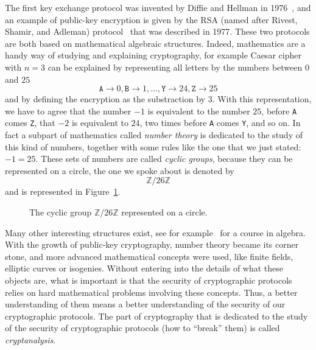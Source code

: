 The first key exchange protocol was invented by Diffie and Hellman in
1976~\cite{DH76}, and an example of public-key encryption is given by the RSA
(named after Rivest, Shamir, and Adleman) protocol~\cite{RSA78} that was
described in 1977. These two protocols are both based on mathematical algebraic
structures. Indeed, mathematics are a handy way of studying and explaining
cryptography, for example Caesar cipher with $n=3$ can be explained by
representing all letters by the numbers between $0$ and $25$
\[
  \texttt{A}\to 0, \texttt{B} \to 1, \dots,\texttt{Y}\to24, \texttt{Z}\to25
\]
and by defining the encryption as the substraction by $3$. With this
representation, we have to agree that the number $-1$ is equivalent to the
number $25$, \ie before \texttt{A} comes \texttt{Z}, that $-2$ is equivalent to
$24$, \ie two times before \texttt{A} comes \texttt{Y}, and so on. In fact a
subpart of mathematics called \emph{number theory} is dedicated to the study of
this kind of numbers, together with some rules like the one that we just stated:
$-1=25$. These sets of numbers are called \emph{cyclic groups}, because they can
be represented on a circle, the one we spoke about is denoted by
\[
  \mathbb{Z}/26\mathbb{Z}
\]
and is represented in Figure~\ref{fig:cyclic-group}.
\begin{figure}[h]
  \centering
  \caption{The cyclic group $\mathbb{Z}/26\mathbb{Z}$ represented on a circle.}
  \label{fig:cyclic-group}
\end{figure}
Many other interesting structures exist, see for example~\cite{Lang04, Perrin96}
for a course in algebra. With the growth of public-key cryptography, number
theory became its corner stone, and more advanced mathematical concepts were
used, like finite fields, elliptic curves or isogenies. Without entering into
the details of what these objects are, what is important is that the security of
cryptographic protocols relies on hard mathematical problems involving these
concepts. Thus, a better understanding of them means a better understanding of
the security of our cryptographic protocols. The part of cryptography that is
dedicated to the study of the security of cryptographic protocols (\ie how to
``break'' them) is called \emph{cryptanalysis}.

